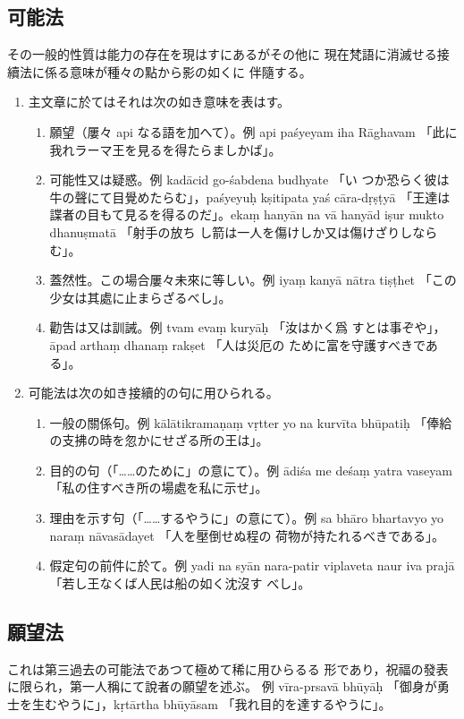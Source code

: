 \subsection{可能法}
\numberParagraph
その一般的性質は能力の存在を現はすにあるがその他に
現在梵語に消滅せる接續法に係る意味が種々の點から影の如くに
伴隨する。
\begin{enumerate}[label=(\arabic*)]
\item 主文章に於てはそれは次の如き意味を表はす。
\begin{enumerate}[label=(\alph*)]
\item 願望（屢々 api なる語を加へて）。例 api paśyeyam iha
Rāghavam 「此に我れラーマ王を見るを得たらましかば」。
\item 可能性又は疑惑。例 kadācid go-śabdena budhyate 「い
つか恐らく彼は牛の聲にて目覺めたらむ」，paśyeyuḥ kṣitipata\-%
yaś cāra-dṛṣṭyā 「王達は諜者の目もて見るを得るのだ」。ekaṃ
hanyān na vā hanyād iṣur mukto dhanuṣmatā 「射手の放ち
し箭は一人を傷けしか又は傷けざりしならむ」。
\item 蓋然性。この場合屢々未來に等しい。例 iyaṃ kanyā
nātra tiṣṭhet 「この少女は其處に止まらざるべし」。
\item 勸吿は又は訓誡。例 tvam evaṃ kuryāḥ 「汝はかく爲
すとは事ぞや」，āpad arthaṃ dhanaṃ rakṣet 「人は災厄の
ために富を守護すべきである」。
\end{enumerate}
\item 可能法は次の如き接續的の句に用ひられる。
\begin{enumerate}[label=(\alph*)]
\item 一般の關係句。例 kālātikramaṇaṃ vṛtter yo na
kurvīta bhūpatiḥ 「俸給の支拂の時を忽かにせざる所の王は」。
\item 目的の句（「……のために」の意にて）。例 ādiśa me
deśaṃ yatra vaseyam 「私の住すべき所の場處を私に示せ」。
\item 理由を示す句（「……するやうに」の意にて）。例 sa
bhāro bhartavyo yo naraṃ nāvasādayet 「人を壓倒せぬ程の
荷物が持たれるべきである」。
\item 假定句の前件に於て。例 yadi na syān nara-patir
viplaveta naur iva prajā 「若し王なくば人民は船の如く沈沒す
べし」。
\end{enumerate}
\end{enumerate}

\subsection{願望法}
\numberParagraph
これは第三過去の可能法であつて極めて稀に用ひらるる
形であり，祝福の發表に限られ，第一人稱にて說者の願望を述ぶ。
例 vīra-prsavā bhūyāḥ 「御身が勇士を生むやうに」，kṛtārtha
bhūyāsam 「我れ目的を達するやうに」。

